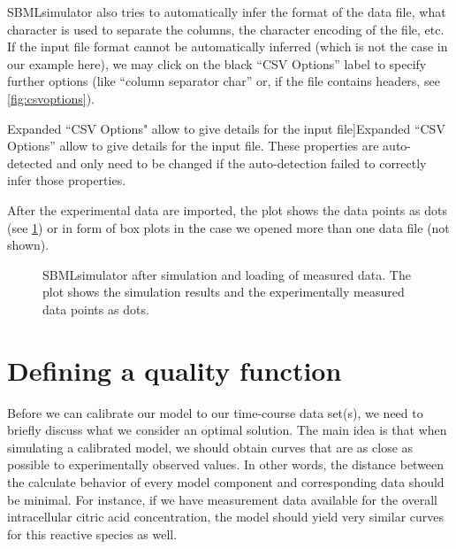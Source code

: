 SBMLsimulator also tries to automatically infer the format of the data file, \eg what character is used to separate the columns, the character encoding of the file, etc.
If the input file format cannot be automatically inferred (which is not the case in our example here), we may click on the black ``CSV Options'' label to specify further options (like ``column separator char'' or, if the file contains headers, see \cref{fig:csvoptions}).
\begin{SCfigure}%
{}
\caption[Expanded ``CSV Options" allow to give details for the input file]{Expanded ``CSV Options'' allow to give details for the input file.
These properties are auto-detected and only need to be changed if the auto-detection failed to correctly infer those properties.}
\label{fig:csvoptions}
\end{SCfigure}
After the experimental data are imported, the plot shows the data points as dots (see \cref{fig:simulationResultsWithData}) or in form of box plots in the case we opened more than one data file (not shown).
\begin{figure}[t]
\centering
{}
\caption[SBMLsimulator after simulation and loading of measured data]{SBMLsimulator after simulation and loading of measured data.
The plot shows the simulation results and the experimentally measured data points as dots.}
\label{fig:simulationResultsWithData}
\end{figure}

\section{Defining a quality function}
\label{sec:QualityDefinition}

Before we can calibrate our model to our time-course data set(s), we need to briefly discuss what we consider an optimal solution.
The main idea is that when simulating a calibrated model, we should obtain curves that are as close as possible to experimentally observed values.
In other words, the distance between the calculate behavior of every model component and corresponding data should be minimal.
For instance, if we have measurement data available for the overall intracellular citric acid concentration, the model should yield very similar curves for this reactive species as well.

